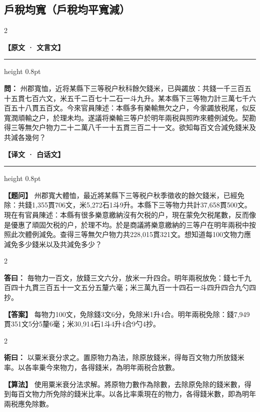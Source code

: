 \documentclass[11pt,a4paper]{article}
\newcommand{\ClassicalQuestion}[1]{\par\noindent\textbf{\color{problemcolor}問：}#1\par}
\newcommand{\ClassicalAnswer}[1]{\par\noindent\textbf{\color{answercolor}答曰：}#1\par}
\newcommand{\ClassicalMethod}[1]{\par\noindent\textbf{\color{methodcolor}術曰：}#1\par}
\newcommand{\ModernQuestion}[1]{\par\noindent\textbf{\color{modernlabel}【题问】}#1\par}
\newcommand{\ModernAnswer}[1]{\par\noindent\textbf{\color{answercolor}【答案】}#1\par}
\newcommand{\ModernMethod}[1]{\par\noindent\textbf{\color{methodcolor}【算法】}#1\par}
\newcommand{\ClassicalHeader}{%
  \begin{center}\textbf{\color{headerclassical}【原文 · 文言文】}\end{center}
  \vspace{-0.5em}
  \hrule height 0.8pt
  \vspace{0.5em}
}
\newcommand{\ModernHeader}{%
  \begin{center}\textbf{\color{headermodern}【译文 · 白话文】}\end{center}
  \vspace{-0.5em}
  \hrule height 0.8pt
  \vspace{0.5em}
}
\begin{document}
\subsection*{\color{sectioncolor}戶稅均寬（戶稅均平寬減）}

\begin{paracol}{2}

\ClassicalHeader

\ClassicalQuestion{%
州郡寬恤，近将某縣下三等税户秋科餘欠錢米，已與蠲放：共錢一千三百五十五貫七百六文，米五千二百七十二石一斗九升。某本縣下三等物力計三萬七千六百五十八貫五百文。今來官員陳述：本縣多有樂輸無欠之户，今䝉蠲放税尾，似反寬潤頑輸之户，於理未均。遂議将樂輸三等户於明年兩税與照昨來體例減免。契勘得三等無欠户物力二十二萬八千一十五貫三百二十一文。欲知每百文合減免錢米及共減各幾何？}

\switchcolumn

\ModernHeader

\ModernQuestion{%
州郡寬大體恤，最近將某縣下三等税户秋季徵收的餘欠錢米，已經免除：共錢1,355貫706文，米5,272石1斗9升。本縣下三等物力共計37,658貫500文。現在有官員陳述：本縣有很多樂意繳納沒有欠税的户，現在蒙免欠税尾數，反而像是優惠了頑固欠税的户，於理不均。於是商議將樂意繳納的三等户在明年兩税中按照此次體例減免。查得三等無欠户物力共228,015貫321文。想知道每100文物力應減免多少錢米以及共減免多少？
}

\end{paracol}

\begin{paracol}{2}

\ClassicalAnswer{%
毎物力一百文，放錢三文六分，放米一升四合。明年兩税放免：錢七千九百四十九貫三百五十一文五分五釐六毫；米三萬九百一十四石一斗四升四合九勺四抄。}

\switchcolumn

\ModernAnswer{%
每物力100文，免除錢3文6分，免除米1升4合。明年兩税免除：錢7,949貫351文5分5釐6毫；米30,914石1斗4升4合9勺4抄。
}

\end{paracol}

\begin{paracol}{2}

\ClassicalMethod{%
以粟米衰分求之。置原物力為法，除原放錢米，得毎百文物力所放錢米率。以各率乗今來物力，各得錢米，為明年兩税合放數。}

\switchcolumn

\ModernMethod{%
使用粟米衰分法求解。將原物力數作為除數，去除原免除的錢米數，得到每百文物力所免除的錢米比率。以各比率乘現在的物力，各得錢米數，即為明年兩税應免除數。
}

\end{paracol}
\end{document}

